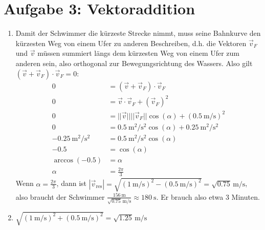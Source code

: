 \documentclass{gadsescript}
\begin{document}
\section*{Aufgabe 3: Vektoraddition}
\begin{enumerate}[label=\alph*)]
	\item Damit der Schwimmer die kürzeste Strecke nimmt, muss seine Bahnkurve den kürzesten Weg von einem Ufer zu anderen Beschreiben, d.h. die Vektoren $\vec v_F $ und $ \vec v $ müssen summiert längs dem kürzesten Weg von einem Ufer zum anderen sein, also orthogonal zur Bewegungsrichtung des Wassers. Also gilt $\left(\vec v + \vec v_F\right) \cdot \vec v_F = 0 $:
		\begin{align*}
			0 &= \left( \vec v + \vec v_F \right) \cdot \vec v_F\\
			0 &= \vec v \cdot \vec v_F + \left(\vec v_F \right)^2\\
			0 &= ||\vec v|| ||\vec v_F|| \cos(\alpha) + \left(\qty{0.5}{\metre\per\second}\right)^2\\
			0 &= \qty{0.5}{\square\metre\per\square\second} \cos(\alpha) + \qty{0.25}{\square\metre\per\square\second}\\
			\qty{-0.25}{\square\metre\per\square\second} &= \qty{0.5}{\square\metre\per\square\second} \cos(\alpha)\\
			-0.5 &= \cos(\alpha)\\
			\arccos(-0.5) &= \alpha\\
			\alpha &= \frac{2\pi}{3}
		\end{align*}
		Wenn $\alpha = \frac{2\pi}{3}$, dann ist $ |\vec v_{\text{res}}| = \sqrt{\left(\qty{1}{\metre\per\second}\right)^2 - \left(\qty{0.5}{\metre\per\second} \right)^2} = \sqrt{0.75}\,\unit{\metre\per\second} $, also braucht der Schwimmer $\frac{\qty{156}{\metre}}{\sqrt{0.75}\,\unit{\metre\per\second}} \approx \qty{180}{\second}$. Er brauch also etwa 3 Minuten.
	\item $\sqrt{\left(\qty{1}{\metre\per\second}\right)^2 + \left(\qty{0.5}{\metre\per\second}\right)^2} = \sqrt{1.25}\,\unit{\metre\per\second} $

\end{enumerate}
\end{document}

